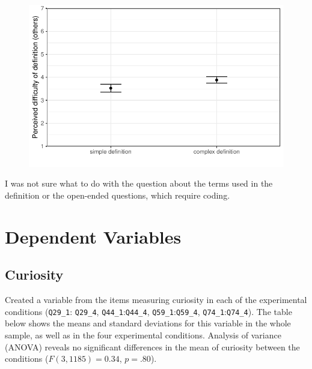 \documentclass[
]{article}
\begin{document}
\begin{figure}

{\centering \includegraphics{BioMADE-fall2025-data-analysis_files/figure-pdf/defn-MC-other-1.pdf}

}

\end{figure}

I was not sure what to do with the question about the terms used in the
definition or the open-ended questions, which require coding.

\hypertarget{dependent-variables}{%
\section{Dependent Variables}\label{dependent-variables}}

\hypertarget{curiosity}{%
\subsection{Curiosity}\label{curiosity}}

Created a variable from the items measuring curiosity in each of the
experimental conditions (\texttt{Q29\_1}: \texttt{Q29\_4},
\texttt{Q44\_1}:\texttt{Q44\_4}, \texttt{Q59\_1}:\texttt{Q59\_4},
\texttt{Q74\_1}:\texttt{Q74\_4}). The table below shows the means and
standard deviations for this variable in the whole sample, as well as in
the four experimental conditions. Analysis of variance (ANOVA) reveals
no significant differences in the mean of curiosity between the
conditions (\(F(3, 1185) = 0.34\), \(p = .80\)).
\end{document}
